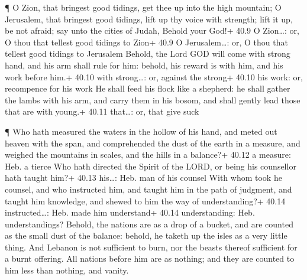  ¶ O Zion, that bringest good tidings, get thee up into the
high mountain; O Jerusalem, that bringest good tidings, lift up thy
voice with strength; lift it up, be not afraid; say unto the cities of
Judah, Behold your God!+ 40.9 O Zion\ldots: or, O thou that tellest good
tidings to Zion+ 40.9 O Jerusalem\ldots: or, O thou that tellest good
tidings to Jerusalem  Behold, the Lord GOD will come with
strong hand, and his arm shall rule for him: behold, his reward is with
him, and his work before him.+ 40.10 with strong\ldots: or, against the
strong+ 40.10 his work: or, recompence for his work  He
shall feed his flock like a shepherd: he shall gather the lambs with his
arm, and carry them in his bosom, and shall gently lead those that are
with young.+ 40.11 that\ldots: or, that give suck

 ¶ Who hath measured the waters in the hollow of his hand,
and meted out heaven with the span, and comprehended the dust of the
earth in a measure, and weighed the mountains in scales, and the hills
in a balance?+ 40.12 a measure: Heb. a tierce  Who hath
directed the Spirit of the LORD, or being his counsellor hath taught
him?+ 40.13 his\ldots: Heb. man of his counsel  With whom
took he counsel, and who instructed him, and taught him in the path of
judgment, and taught him knowledge, and shewed to him the way of
understanding?+ 40.14 instructed\ldots: Heb. made him understand+ 40.14
understanding: Heb. understandings?  Behold, the nations
are as a drop of a bucket, and are counted as the small dust of the
balance: behold, he taketh up the isles as a very little thing.
 And Lebanon is not sufficient to burn, nor the beasts
thereof sufficient for a burnt offering.  All nations
before him are as nothing; and they are counted to him less than
nothing, and vanity.

